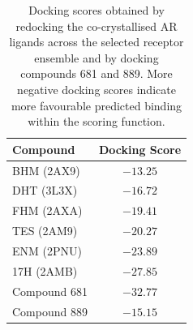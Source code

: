 \begin{table}[htbp]
    \centering
    \small
    \caption{Docking scores obtained by redocking the co-crystallised AR ligands across the selected receptor ensemble and by docking compounds 681 and 889. More negative docking scores indicate more favourable predicted binding within the scoring function.}
    \label{tab:ar_redocking_scores}
    \begin{tabular}{l c}
        \hline
        \textbf{Compound} & \textbf{Docking Score} \\
        \hline
        BHM (2AX9) & $-13.25$ \\
        DHT (3L3X) & $-16.72$ \\
        FHM (2AXA) & $-19.41$ \\
        TES (2AM9) & $-20.27$ \\
        ENM (2PNU) & $-23.89$ \\
        17H (2AMB) & $-27.85$ \\
        \hline
        Compound 681 & $-32.77$ \\
        Compound 889 & $-15.15$ \\
        \hline
    \end{tabular}
\end{table}